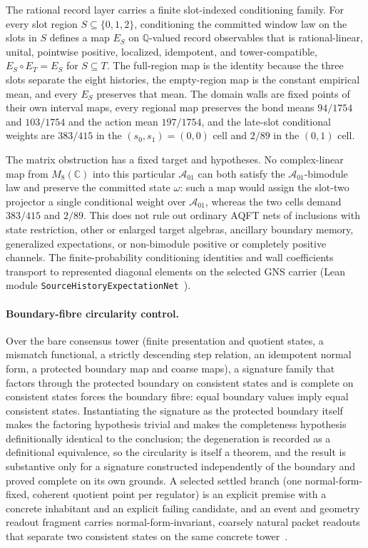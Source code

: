 \documentclass[11pt]{article}
\theoremstyle{remark}
\theoremstyle{plain}
\begin{document}
The rational record layer carries a finite slot-indexed conditioning family.
For every slot region \(S\subseteq\{0,1,2\}\), conditioning the
committed window law on the slots in \(S\) defines a map \(E_S\) on
\(\mathbb Q\)-valued record observables that is rational-linear, unital,
pointwise positive, localized, idempotent, and tower-compatible,
\(E_S\circ E_T=E_S\) for \(S\subseteq T\).  The full-region map is the
identity because the three slots separate the eight histories, the
empty-region map is the constant empirical mean, and every \(E_S\) preserves
that mean.  The domain walls are fixed points of their own interval maps,
every regional map preserves the bond means \(94/1754\) and \(103/1754\)
and the action mean \(197/1754\), and the late-slot conditional weights are
\(383/415\) in the \((s_0,s_1)=(0,0)\) cell and \(2/89\) in the \((0,1)\)
cell.

The matrix obstruction has a fixed target and hypotheses.  No complex-linear
map from \(M_8(\mathbb C)\) into this particular \(\mathcal A_{01}\) can
both satisfy the \(\mathcal A_{01}\)-bimodule law and preserve the committed
state \(\omega\): such a map would assign the slot-two projector a single
conditional weight over \(\mathcal A_{01}\), whereas the two cells demand
\(383/415\) and \(2/89\).  This does not rule out ordinary AQFT nets of
inclusions with state restriction, other or enlarged target algebras,
ancillary boundary memory, generalized expectations, or non-bimodule
positive or completely positive channels.  The finite-probability
conditioning identities and wall coefficients transport to represented
diagonal elements on the selected GNS carrier (Lean module
\texttt{SourceHistoryExpectationNet}~\cite{ophrepo}).

\paragraph{Boundary-fibre circularity control.}
Over the bare consensus tower (finite presentation and quotient states, a
mismatch functional, a strictly descending step relation, an idempotent
normal form, a protected boundary map and coarse maps), a signature family that factors through the
protected boundary on consistent states and is complete on consistent
states forces the boundary fibre: equal boundary values imply equal
consistent states. Instantiating the signature as the protected boundary
itself makes the factoring hypothesis trivial and makes the completeness
hypothesis definitionally identical to the conclusion; the degeneration is
recorded as a definitional equivalence, so the circularity is itself a
theorem, and the result is substantive only for a signature constructed
independently of the boundary and proved complete on its own grounds. A
selected settled branch (one normal-form-fixed, coherent quotient point
per regulator) is an explicit premise with a concrete inhabitant and an
explicit failing candidate, and an event and geometry readout fragment
carries normal-form-invariant, coarsely natural packet readouts that
separate two consistent states on the same concrete tower~\cite{ophrepo}.
\end{document}
